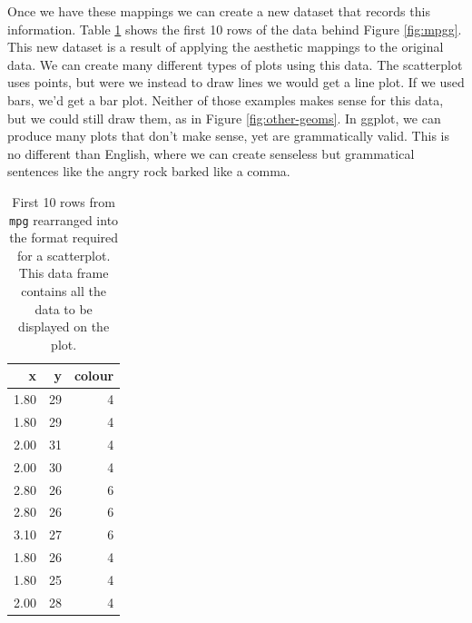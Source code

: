 Once we have these mappings we can create a new dataset that records
this information. Table \ref{tbl:mapping} shows the first 10 rows of the
data behind Figure \ref{fig:mpgg}. This new dataset is a result of
applying the aesthetic mappings to the original data. We can create many
different types of plots using this data. The scatterplot uses points,
but were we instead to draw lines we would get a line plot. If we used
bars, we'd get a bar plot. Neither of those examples makes sense for
this data, but we could still draw them, as in Figure
\ref{fig:other-geoms}. In ggplot, we can produce many plots that don't
make sense, yet are grammatically valid. This is no different than
English, where we can create senseless but grammatical sentences like
the angry rock barked like a comma.

\begin{table}[ht]
\centering
\begin{tabular}{rrr}
  \hline
x & y & colour \\ 
  \hline
1.80 &  29 &   4 \\ 
  1.80 &  29 &   4 \\ 
  2.00 &  31 &   4 \\ 
  2.00 &  30 &   4 \\ 
  2.80 &  26 &   6 \\ 
  2.80 &  26 &   6 \\ 
  3.10 &  27 &   6 \\ 
  1.80 &  26 &   4 \\ 
  1.80 &  25 &   4 \\ 
  2.00 &  28 &   4 \\ 
   \hline
\end{tabular}
\caption{First 10 rows from \texttt{mpg} rearranged into the format required for a scatterplot.  This data frame contains all the data to be displayed on the plot.} 
\label{tbl:mapping}
\end{table}

\begin{Shaded}
\begin{Highlighting}[]
   \NormalTok{) +}\StringTok{ }
\StringTok{  }\NormalTok{(} \NormalTok{)}
   \NormalTok{, }
   \NormalTok{, } \NormalTok{) +}\StringTok{ }
\StringTok{  }\NormalTok{(} \NormalTok{)}
\end{Highlighting}
\end{Shaded}


